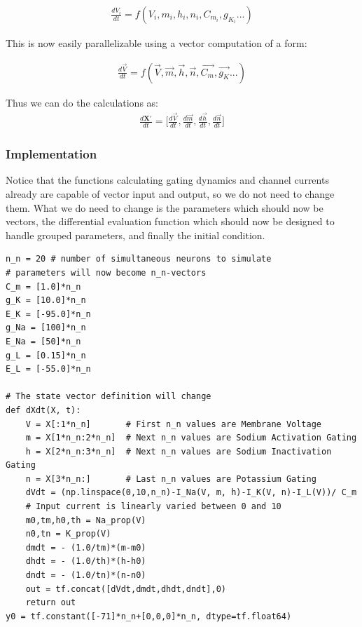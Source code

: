 \documentclass[10pt,letterpaper]{article}
\begin{document}
\begin{eqnarray}\frac{dV_i}{dt}=f(V_i,m_i,h_i,n_i,C_{m_i},g_{K_i}...)\end{eqnarray}

This is now easily parallelizable using a vector computation of a form: 

\begin{eqnarray}\frac{d\vec{V}}{dt}=f(\vec{V},\vec{m},\vec{h},\vec{n},\vec{C_m},\vec{g_K}...)\end{eqnarray}

Thus we can do the calculations as:
\begin{eqnarray}\frac{d\mathbf{X'}}{dt}= \Big[\frac{d\vec{V}}{dt},\frac{d\vec{m}}{dt},\frac{d\vec{h}}{dt},\frac{d\vec{n}}{dt}\Big]\end{eqnarray}

\subsubsection*{Implementation}

Notice that the functions calculating gating dynamics and channel currents already are capable of vector input and output, so we do not need to change them. What we do need to change is the parameters which should now be vectors, the differential evaluation  function which should now be designed to handle grouped parameters, and finally the initial condition.

\begin{verbatim}
n_n = 20 # number of simultaneous neurons to simulate
# parameters will now become n_n-vectors
C_m = [1.0]*n_n
g_K = [10.0]*n_n
E_K = [-95.0]*n_n
g_Na = [100]*n_n
E_Na = [50]*n_n 
g_L = [0.15]*n_n
E_L = [-55.0]*n_n

# The state vector definition will change
def dXdt(X, t):
    V = X[:1*n_n]       # First n_n values are Membrane Voltage
    m = X[1*n_n:2*n_n]  # Next n_n values are Sodium Activation Gating
    h = X[2*n_n:3*n_n]  # Next n_n values are Sodium Inactivation Gating
    n = X[3*n_n:]       # Last n_n values are Potassium Gating
    dVdt = (np.linspace(0,10,n_n)-I_Na(V, m, h)-I_K(V, n)-I_L(V))/ C_m 
    # Input current is linearly varied between 0 and 10
    m0,tm,h0,th = Na_prop(V)
    n0,tn = K_prop(V)
    dmdt = - (1.0/tm)*(m-m0)
    dhdt = - (1.0/th)*(h-h0)
    dndt = - (1.0/tn)*(n-n0)
    out = tf.concat([dVdt,dmdt,dhdt,dndt],0)
    return out
y0 = tf.constant([-71]*n_n+[0,0,0]*n_n, dtype=tf.float64)
\end{verbatim}
\end{document}
